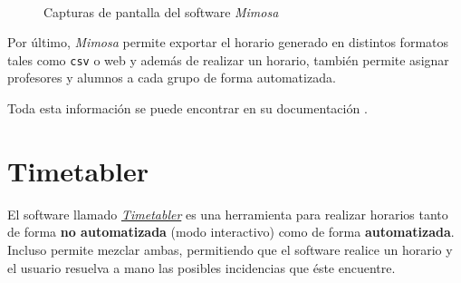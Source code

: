 \begin{figure}[!h]
    \centering
    \mbox {
    \qquad
    }
    \caption{Capturas de pantalla del software \textit{Mimosa}}
    \label{mimosa}
\end{figure}

Por último, \textit{Mimosa} permite exportar el horario generado en distintos formatos tales como \texttt{csv} o web y además de realizar un horario, también permite asignar profesores y alumnos a cada grupo de forma automatizada.

Toda esta información se puede encontrar en su documentación \cite{mimosa}.

\section{Timetabler}

El software llamado \href{http://www.timetabler.com/}{\textit{Timetabler}} es una herramienta para realizar horarios tanto de forma \textbf{no automatizada} (modo interactivo) como de forma \textbf{automatizada}. Incluso permite mezclar ambas, permitiendo que el software realice un horario y el usuario resuelva a mano las posibles incidencias que éste encuentre.

